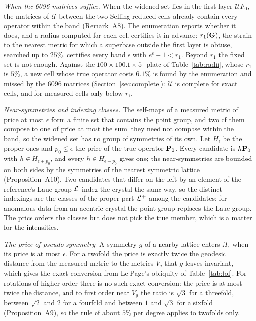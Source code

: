 \emph{When the 6096 matrices suffice.} When the widened set lies in the first layer $\mathcal UF_0$, the matrices of $\mathcal U$ between the two Selling-reduced cells already contain every operator within the band (Remark~A8). The enumeration reports whether it does, and a radius computed for each cell certifies it in advance: $r_1(\Gmet)$, the strain to the nearest metric for which a superbase outside the first layer is obtuse, searched up to $25\%$, certifies every band $\epsilon$ with $e^\epsilon-1<r_1$. Beyond $r_1$ the fixed set is not enough. Against the $100\times100.1\times5$\,\Ang\ plate of Table~\ref{tab:radii}, whose $r_1$ is $5\%$, a new cell whose true operator costs $6.1\%$ is found by the enumeration and missed by the 6096 matrices (Section~\ref{sec:complete}): $\mathcal U$ is complete for exact cells, and for measured cells only below $r_1$.

\emph{Near-symmetries and indexing classes.} The self-maps of a measured metric of price at most $\epsilon$ form a finite set that contains the point group, and two of them compose to one of price at most the sum; they need not compose within the band, so the widened set has no group of symmetries of its own. Let $H_\epsilon$ be the proper ones and $p_0\le\epsilon$ the price of the true operator $\Pop_0$. Every candidate is $h\Pop_0$ with $h\in H_{\epsilon+p_0}$, and every $h\in H_{\epsilon-p_0}$ gives one; the near-symmetries are bounded on both sides by the symmetries of the nearest symmetric lattice (Proposition~A10). Two candidates that differ on the left by an element of the reference's Laue group $\mathcal{L}$ index the crystal the same way, so the distinct indexings are the classes of the proper part $\mathcal{L}^+$ among the candidates; for anomalous data from an acentric crystal the point group replaces the Laue group. The price orders the classes but does not pick the true member, which is a matter for the intensities.

\emph{The price of pseudo-symmetry.}\label{sec:pricing} A symmetry $g$ of a nearby lattice enters $H_\epsilon$ when its price is at most $\epsilon$. For a twofold the price is exactly twice the geodesic distance from the measured metric to the metrics $V_g$ that $g$ leaves invariant, which gives the exact conversion from Le Page's obliquity of Table~\ref{tab:tol}. For rotations of higher order there is no such exact conversion: the price is at most twice the distance, and to first order near $V_g$ the ratio is $\sqrt3$ for a threefold, between $\sqrt2$ and $2$ for a fourfold and between $1$ and $\sqrt3$ for a sixfold (Proposition~A9), so the rule of about $5\%$ per degree applies to twofolds only.

